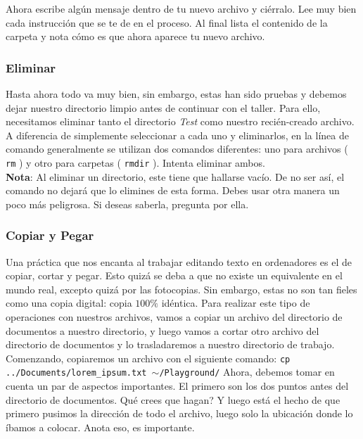 \documentclass[10pt,letterpaper]{article}
\newcommand{\inlinecode}[1]{
\colorbox{light-gray}{\texttt{#1}}
}
\begin{document}
Ahora escribe alg\'un mensaje dentro de tu nuevo archivo y ci\'erralo. Lee muy bien cada instrucci\'on que se te de en el proceso. Al final lista el contenido de la carpeta y nota c\'omo es que ahora aparece tu nuevo archivo.

\subsubsection{Eliminar}
Hasta ahora todo va muy bien, sin embargo, estas han sido pruebas y debemos dejar nuestro directorio limpio antes de continuar con el taller. Para ello, necesitamos eliminar tanto el directorio \emph{Test} como nuestro reci\'en-creado archivo. A diferencia de simplemente seleccionar a cada uno y eliminarlos, en la l\'inea de comando generalmente se utilizan dos comandos diferentes: uno para archivos (\inlinecode{rm}) y otro para carpetas (\inlinecode{rmdir}). Intenta eliminar ambos.\\

\textbf{Nota}: Al eliminar un directorio, este tiene que hallarse vac\'io. De no ser as\'i, el comando no dejar\'a que lo elimines de esta forma. Debes usar otra manera un poco m\'as peligrosa. Si deseas saberla, pregunta por ella.

\subsubsection{Copiar y Pegar}
Una pr\'actica que nos encanta al trabajar editando texto en ordenadores es el de copiar, cortar y pegar. Esto quiz\'a se deba a que no existe un equivalente en el mundo real, excepto quiz\'a por las fotocopias. Sin embargo, estas no son tan fieles como una copia digital: copia $100\%$ id\'entica. Para realizar este tipo de operaciones con nuestros archivos, vamos a copiar un archivo del directorio de documentos a nuestro directorio, y luego vamos a cortar otro archivo del directorio de documentos y lo trasladaremos a nuestro directorio de trabajo.\\

Comenzando, copiaremos un archivo con el siguiente comando: \inlinecode{cp ../Documents/lorem\_ipsum.txt $\sim$/Playground/} Ahora, debemos tomar en cuenta un par de aspectos importantes. El primero son los dos puntos antes del directorio de documentos. Qu\'e crees que hagan? Y luego est\'a el hecho de que primero pusimos la direcci\'on de todo el archivo, luego solo la ubicaci\'on donde lo \'ibamos a colocar. Anota eso, es importante.\\
\end{document}
